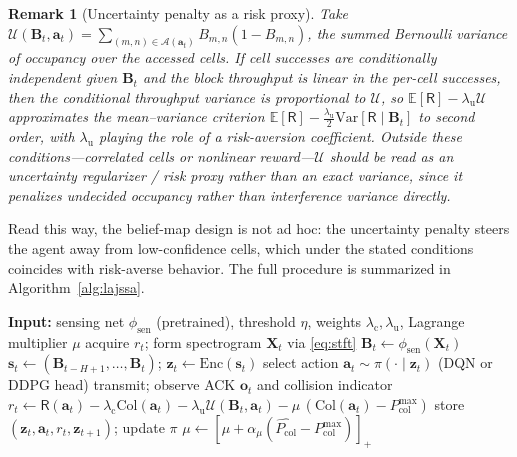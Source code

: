 \documentclass[journal]{IEEEtran}
\newtheorem{remark}{Remark}
\newcommand{\E}{\mathbb{E}}
\newcommand{\rx}{r}                       %
\newcommand{\spec}{\bm{X}}                 %
\newcommand{\cell}{(m,n)}                  %
\newcommand{\bel}{B}                       %
\newcommand{\belmap}{\bm{B}}               %
\newcommand{\thr}{\eta}                    %
\newcommand{\act}{\bm{a}}                  %
\newcommand{\state}{\bm{s}}                %
\newcommand{\obs}{\bm{o}}                  %
\newcommand{\histlen}{H}                   %
\newcommand{\pol}{\pi}                     %
\newcommand{\Pcol}{P_{\mathrm{col}}}       %
\newcommand{\Pcolmax}{P_{\mathrm{col}}^{\max}} %
\newcommand{\thru}{\mathsf{R}}             %
\begin{document}
\begin{remark}[Uncertainty penalty as a risk proxy]
\label{prop:risk}
Take $\mathcal{U}(\belmap_t,\act_t)=\sum_{\cell\in\mathcal{A}(\act_t)}
\bel_{m,n}(1-\bel_{m,n})$, the summed Bernoulli variance of occupancy over
the accessed cells. \emph{If} cell successes are conditionally independent
given $\belmap_t$ and the block throughput is linear in the per-cell
successes, then the conditional throughput variance is proportional to
$\mathcal{U}$, so $\E[\thru]-\lambda_{\mathrm{u}}\mathcal{U}$ approximates the
mean--variance criterion
$\E[\thru]-\tfrac{\lambda_{\mathrm{u}}}{2}\mathrm{Var}[\thru\mid\belmap_t]$
to second order, with $\lambda_{\mathrm{u}}$ playing the role of a
risk-aversion coefficient. Outside these conditions---correlated cells or
nonlinear reward---$\mathcal{U}$ should be read as an \emph{uncertainty
regularizer / risk proxy} rather than an exact variance, since it penalizes
undecided occupancy rather than interference variance directly.
\end{remark}

\noindent Read this way, the belief-map design is not ad hoc: the
uncertainty penalty steers the agent away from low-confidence cells, which
under the stated conditions coincides with risk-averse behavior. The full
procedure is summarized in Algorithm~\ref{alg:lajssa}.

\begin{algorithm}[t]
\caption{LA-JSSA training (one episode)}
\label{alg:lajssa}
\begin{algorithmic}[1]
\State \textbf{Input:} sensing net $\phi_{\mathrm{sen}}$ (pretrained),
threshold $\thr$, weights $\lambda_{\mathrm{c}},\lambda_{\mathrm{u}}$,
Lagrange multiplier $\mu$
  \State acquire $\rx_t$; form spectrogram $\spec_t$ via \eqref{eq:stft}
  \State $\belmap_t \gets \phi_{\mathrm{sen}}(\spec_t)$
  \State $\state_t \gets (\belmap_{t-\histlen+1},\dots,\belmap_t)$;
         $\bm{z}_t \gets \mathrm{Enc}(\state_t)$
  \State select action $\act_t \sim \pol(\cdot\mid\bm{z}_t)$
         (DQN or DDPG head)
  \State transmit; observe ACK $\obs_t$ and collision indicator
  \State $r_t \gets \thru(\act_t) - \lambda_{\mathrm{c}}\mathrm{Col}(\act_t)
         - \lambda_{\mathrm{u}}\mathcal{U}(\belmap_t,\act_t)
         - \mu\,(\mathrm{Col}(\act_t)-\Pcolmax)$
  \State store $(\bm{z}_t,\act_t,r_t,\bm{z}_{t+1})$; update $\pol$
  \State $\mu \gets [\mu + \alpha_\mu(\widehat{\Pcol}-\Pcolmax)]_+$
\EndFor
\end{algorithmic}
\end{algorithm}
\end{document}
